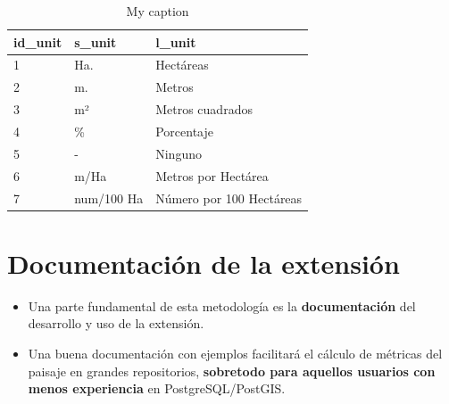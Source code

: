 \begin{table}[]
\centering
\caption{My caption}
\label{my-label}
\begin{tabular}{@{}lll@{}}
\toprule
\textbf{id\_unit} & \textbf{s\_unit} & \textbf{l\_unit}         \\ \midrule
1                 & Ha.              & Hectáreas                \\
2                 & m.               & Metros                   \\
3                 & m²               & Metros cuadrados         \\
4                 & \%               & Porcentaje               \\
5                 & -                & Ninguno                  \\
6                 & m/Ha             & Metros por Hectárea      \\
7                 & num/100 Ha       & Número por 100 Hectáreas \\ \bottomrule
\end{tabular}
\end{table}















\section{Documentación de la extensión}

\begin{graybox}
\begin{itemize}
\item Una parte fundamental de esta metodología es la \textbf{documentación} del desarrollo y uso de la extensión. 
\item Una buena documentación con ejemplos facilitará el cálculo de métricas del paisaje en grandes repositorios, \textbf{sobretodo para aquellos usuarios con menos experiencia} en PostgreSQL/PostGIS.
\end{itemize}
\end{graybox}

